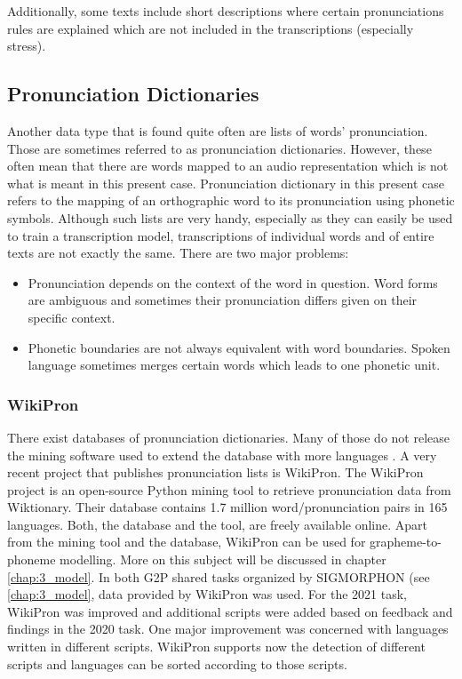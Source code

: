 Additionally, some texts include short descriptions where certain pronunciations rules are explained which are not included in the transcriptions (especially stress). 

\subsection{Pronunciation Dictionaries}
Another data type that is found quite often are lists of words' pronunciation. Those are sometimes referred to as pronunciation dictionaries. However, these often mean that there are words mapped to an audio representation which is not what is meant in this present case. Pronunciation dictionary in this present case refers to the mapping of an orthographic word to its pronunciation using phonetic symbols. Although such lists are very handy, especially as they can easily be used to train a transcription model, transcriptions of individual words and of entire texts are not exactly the same. There are two major problems:

\begin{itemize}
\item Pronunciation depends on the context of the word in question. Word forms are ambiguous and sometimes their pronunciation differs given on their specific context.  
\item Phonetic boundaries are not always equivalent with word boundaries. Spoken language sometimes merges certain words which leads to one phonetic unit. 
\end{itemize} 


\subsubsection*{WikiPron}
There exist databases of pronunciation dictionaries. Many of those do not release the mining software used to extend the database with more languages \citep{Lee&Ashby.2020}. A very recent project that publishes pronunciation lists is WikiPron. The WikiPron project \citep{Lee&Ashby.2020} is an open-source Python mining tool to retrieve pronunciation data from Wiktionary. Their database contains 1.7 million word/pronunciation pairs in 165 languages. Both, the database and the tool, are freely available online. Apart from the mining tool and the database, WikiPron can be used for grapheme-to-phoneme modelling. More on this subject will be discussed in chapter \ref{chap:3_model}.
In both G2P shared tasks organized by SIGMORPHON (see \ref{chap:3_model}, data provided by WikiPron was used. For the 2021 task, WikiPron was improved and additional scripts were added based on feedback and findings in the 2020 task. One major improvement was concerned with languages written in different scripts. WikiPron supports now the detection of different scripts and languages can be sorted according to those scripts.

 


 	